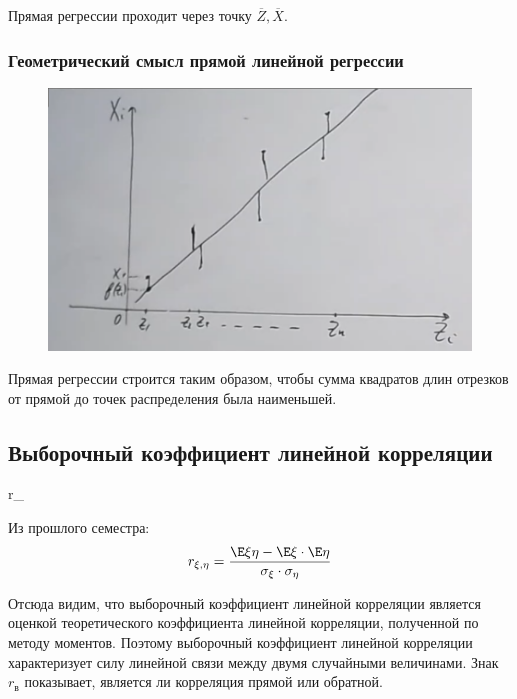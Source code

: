 \begin{remark}
    Прямая регрессии проходит через точку \(\overline{Z}, \overline{X}\).
\end{remark}

\subsubsection{Геометрический смысл прямой линейной регрессии}

\begin{figure}[h]
    \centering
    \includegraphics[scale=0.2]{imgs/regression.png}
\end{figure}

Прямая регрессии строится таким образом, чтобы сумма квадратов длин отрезков от прямой до точек распределения была наименьшей.

\subsection{Выборочный коэффициент линейной корреляции}

\begin{definition}
    \begin{myemph}
        r_{} \coloneqq {}
    \end{myemph}
\end{definition}

\begin{remark}
    Из прошлого семестра:
    \[r_{\xi, \eta} = \frac{\E \xi \eta - \E \xi \cdot \E \eta}{\sigma_\xi \cdot \sigma_\eta}\]
\end{remark}

Отсюда видим, что выборочный коэффициент линейной корреляции является оценкой теоретического коэффициента линейной корреляции, полученной по методу моментов. Поэтому выборочный коэффициент линейной корреляции характеризует силу линейной связи между двумя случайными величинами. Знак \(r_{\mathrm{в}}\) показывает, является ли корреляция прямой или обратной.

